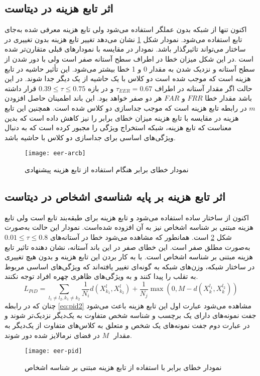 \subsection{اثر تابع هزینه  در دیتاست }
اکنون تنها از شبکه  بدون عملگر  استفاده می‌شود ولی تابع هزینه  معرفی شده به‌جای تابع  استفاده می‌شود. نمودار شکل
\ref{fig:eer-arcb}
نشان می‌دهد تغییر تابع هزینه بدون تغییری در ساختار می‌تواند تاثیرگذار باشد. نمودار در مقایسه با نمودارهای قبلی متقارن‌تر شده است .در این شکل میزان خطا در اطراف سطح آستانه صفر است ولی با دور شدن از سطح آستانه و نزدیک شدن به مقدار 0 و 1 خطا بیشتر می‌شود. این تأثیر حاشیه در تابع هزینه  است که موجب شده است دو کلاس با یک حاشیه از یک دیگر جدا شوند. در این حالت اگر مقدار آستانه در اطراف 
$\tau_{EER} = 0.67$
و در بازه 
$ 0.39\le \tau \le 0.75$
قرار داشته باشد مقدار خطا
 $FRR$ و $FAR$
 هر دو صفر خواهد بود. این باند اطمینان حاصل افزودن 
 $m$
در رابطه تابع هزینه
است که موجب جداسازی دو کلاس شده است. همچنین این تابع هزینه در مقایسه با تابع هزینه
میزان خطای برابر را نیز کاهش داده است که بدین معناست که تابع هزینه، شبکه استخراج ویژگی را مجبور کرده است که به دنبال ویژگی‌های اساسی برای جداسازی دو کلاس با حاشیه باشد.
\begin{figure}[h]
	\centerline{\texttt{[image: eer-arcb]}}
	\caption{نمودار خطای برابر هنگام استفاده از تابع هزینه  پیشنهادی}
	\label{fig:eer-arcb}
\end{figure}

\subsection{اثر تابع هزینه بر پایه شناسه‌ی اشخاص در دیتاست }
اکنون از ساختار ساده  استفاده می‌شود و تابع هزینه برای طبقه‌بند تابع  است ولی تابع هزینه مبتنی بر شناسه اشخاص نیز به آن افزوده شده‌است. نمودار این حالت به‌صورت شکل 
\ref{fig:eer-pid}
است. همانطور که مشاهده می‌شود خطا در آستانه‌های 
$ 0.01\le \tau \le 0.8$
به‌صورت مطلق صفر است. این خطای صفر در این باند آستانه، نشان دهنده تاثیر تابع هزینه مبتنی بر شناسه اشخاص است. با به کار بردن این تابع هزینه و بدون هیچ تغییری در ساختار شبکه، وزن‌های شبکه به گونه‌ای تغییر یافته‌اند که ویژگی‌های اساسی مربوط به تقلب را پیدا کنند و به ویژگی‌های ظاهری چهره افراد توجه نکنند. 
\begin{equation}\label{eq:pid2}
	L_{PiD} = \sum_{l_1 \ne l_2,k_1 \ne k_2}{\frac{1}{N_i}d( X_{k_1}^{l},X_{k_2}^{l})+\frac{1}{N_j}\max(0,M-d( X_{k}^{l_1},X_{k}^{l_2} ))}
\end{equation}
چنان که در رابطه 
\ref{eq:pid2}
مشاهده می‌شود  عبارت اول این تابع هزینه باعث می‌شود جفت نمونه‌های دارای یک برچسب و شناسه شخص متفاوت به یک‌دیگر نزدیک‌تر شوند و در عبارت دوم جفت نمونه‌های یک شخص و متعلق به کلاس‌های متفاوت از یک‌دیگر به مقدار ‌
$M$
در فضای نرمالایز شده دور شوند.
\begin{figure}[!h]
	\centerline{\texttt{[image: eer-pid]}}
	\caption{نمودار خطای برابر با استفاده از تابع هزینه مبتنی بر شناسه اشخاص}
	\label{fig:eer-pid}
\end{figure}


